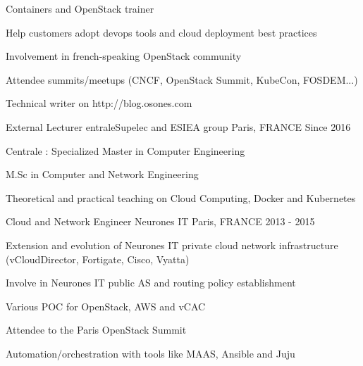 \begin{cventries}
{\begin{cvitems}
        \item {Containers and OpenStack trainer}
        \item {Help customers adopt devops tools and cloud deployment best
          practices}
        \item {Involvement in french-speaking OpenStack community}
        \item {Attendee summits/meetups (CNCF, OpenStack Summit, KubeCon, FOSDEM...)}
        \item {Technical writer on http://blog.osones.com}
      \end{cvitems}
    }

  \cventry
    {External Lecturer} %
    {entraleSupelec and ESIEA group}
    {Paris, FRANCE} %
    {Since 2016} %
    {
      \begin{cvitems} %
        \item {Centrale : Specialized Master in Computer Engineering}
        \item {M.Sc in Computer and Network Engineering}
        \item {Theoretical and practical teaching on Cloud Computing, Docker
          and Kubernetes}
      \end{cvitems}
    }
  \cventry
    {Cloud and Network Engineer}
    {Neurones IT} %
    {Paris, FRANCE} %
    {2013 - 2015} %
    {
      \begin{cvitems} %
        \item {Extension and evolution of Neurones IT private cloud
          network infrastructure (vCloudDirector, Fortigate, Cisco, Vyatta)}
        \item {Involve in Neurones IT public AS and routing policy
          establishment}
        \item {Various POC for OpenStack, AWS and vCAC}
        \item {Attendee to the Paris OpenStack Summit}
        \item {Automation/orchestration with tools like MAAS, Ansible and Juju}
      \end{cvitems}
    }

\end{cventries}
